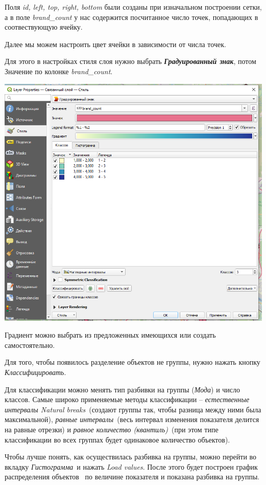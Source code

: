 \documentclass[
]{book}
\begin{document}
Поля \emph{id, left, top, right, bottom} были созданы при изначальном построении сетки, а в поле \emph{brand\_count} у нас содержится посчитанное число точек, попадающих в соотвествующую ячейку.

Далее мы можем настроить цвет ячейки в зависимости от числа точек.

Для этого в настройках стиля слоя нужно выбрать \textbf{\emph{Градуированный знак}}, потом Значение по колонке \emph{brand\_count}.

\includegraphics{figures/21.png}

Градиент можно выбрать из предложенных имеющихся или создать самостоятельно.

Для того, чтобы появилось разделение объектов не группы, нужно нажать кнопку \emph{Классифицировать}.

Для классификации можно менять тип разбивки на группы (\emph{Мода}) и число классов. Самые широко применяемые методы классификации -- \emph{естественные интервалы Natural breaks}~(создают группы так, чтобы разница между ними была максимальной), \emph{равные интервалы}~(весь интервал изменения показателя делится на равные отрезки) и \emph{равное количество (квантиль)}~(при этом типе классификации во всех группах будет одинаковое количество объектов).

Чтобы лучше понять, как осуществилась разбивка на группы, можно перейти во вкладку \emph{Гистограмма}~и нажать \emph{Load values}. После этого будет построен график распределения объектов ~по величине показателя и показана разбивка на группы.
\end{document}
